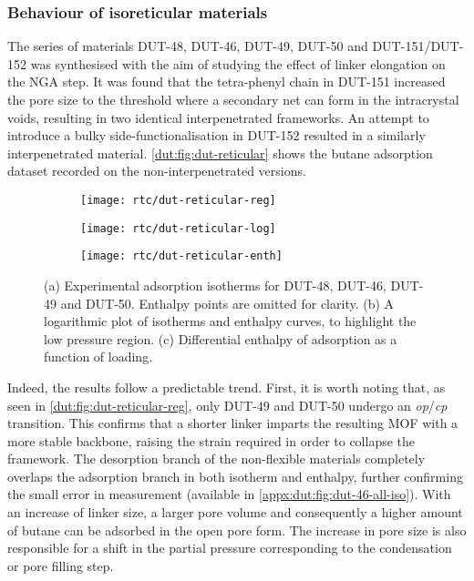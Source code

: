 \subsubsection{Behaviour of isoreticular materials}

The series of materials DUT-48, DUT-46, DUT-49, DUT-50 and DUT-151/DUT-152
was synthesised with the aim of studying the effect of linker 
elongation on the NGA step. It was found that the tetra-phenyl chain
in DUT-151 increased the pore size to the threshold 
where a secondary net can form in the intracrystal voids, resulting 
in two identical interpenetrated frameworks. An attempt to introduce 
a bulky side-functionalisation in DUT-152 resulted in a similarly
interpenetrated material. \autoref{dut:fig:dut-reticular} shows the
butane adsorption dataset recorded on the non-interpenetrated versions.

\begin{figure}[htb]
    \centering
    \begin{subfigure}{0.33\linewidth}
        \texttt{[image: rtc/dut-reticular-reg]}%
        \caption{}\label{dut:fig:dut-reticular-reg}
    \end{subfigure}%
    \begin{subfigure}{0.33\linewidth}
        \texttt{[image: rtc/dut-reticular-log]}%
        \caption{}\label{dut:fig:dut-reticular-log}
    \end{subfigure}%
    \begin{subfigure}{0.33\linewidth}
        \texttt{[image: rtc/dut-reticular-enth]}%
        \caption{}\label{dut:fig:dut-reticular-enth}
    \end{subfigure}%
    \caption{(a) Experimental adsorption isotherms for DUT-48, DUT-46, DUT-49 and 
    DUT-50. Enthalpy points are omitted for clarity. (b) A logarithmic plot of 
    isotherms and enthalpy curves, to highlight the low pressure region. 
    (c) Differential enthalpy of adsorption as a function of loading.}%
    \label{dut:fig:dut-reticular}
\end{figure}


Indeed, the results follow a predictable trend. First, it is worth 
noting that, as seen in \autoref{dut:fig:dut-reticular-reg}, only DUT-49 
and DUT-50 undergo an \textit{op}/\textit{cp} transition. This confirms that 
a shorter linker imparts the resulting MOF with a more stable backbone,
raising the strain required in order to collapse the framework.
The desorption branch of the non-flexible materials completely 
overlaps the adsorption branch in both isotherm and enthalpy, further
confirming the small error in measurement (available in 
\autoref{appx:dut:fig:dut-46-all-iso}).
With an increase of linker size, a larger pore volume and consequently
a higher amount of butane can be adsorbed in the open pore form. 
The increase in pore size is also responsible for a shift in the 
partial pressure corresponding to the condensation or pore filling step.


